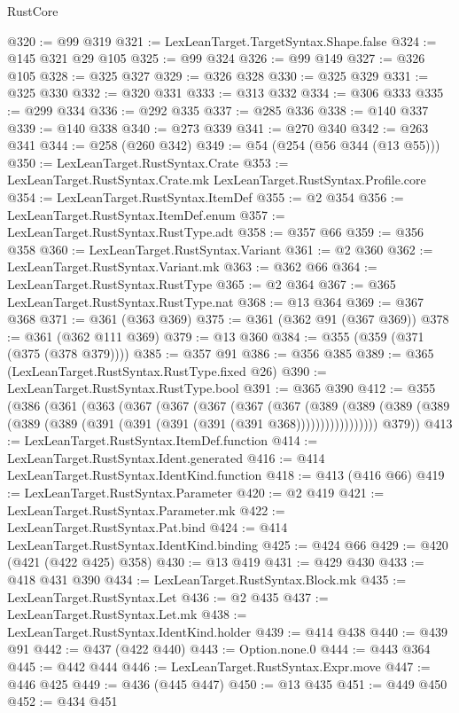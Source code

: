 \begin{lexlean}{RustCore}
\begin{coremodule}
@320 := @99 @319
@321 := LexLeanTarget.TargetSyntax.Shape.false
@324 := @145 @321 @29 @105
@325 := @99 @324
@326 := @99 @149
@327 := @326 @105
@328 := @325 @327
@329 := @326 @328
@330 := @325 @329
@331 := @325 @330
@332 := @320 @331
@333 := @313 @332
@334 := @306 @333
@335 := @299 @334
@336 := @292 @335
@337 := @285 @336
@338 := @140 @337
@339 := @140 @338
@340 := @273 @339
@341 := @270 @340
@342 := @263 @341
@344 := @258 (@260 @342)
@349 := @54 (@254 (@56 @344 (@13 @55)))
@350 := LexLeanTarget.RustSyntax.Crate
@353 := LexLeanTarget.RustSyntax.Crate.mk LexLeanTarget.RustSyntax.Profile.core
@354 := LexLeanTarget.RustSyntax.ItemDef
@355 := @2 @354
@356 := LexLeanTarget.RustSyntax.ItemDef.enum
@357 := LexLeanTarget.RustSyntax.RustType.adt
@358 := @357 @66
@359 := @356 @358
@360 := LexLeanTarget.RustSyntax.Variant
@361 := @2 @360
@362 := LexLeanTarget.RustSyntax.Variant.mk
@363 := @362 @66
@364 := LexLeanTarget.RustSyntax.RustType
@365 := @2 @364
@367 := @365 LexLeanTarget.RustSyntax.RustType.nat
@368 := @13 @364
@369 := @367 @368
@371 := @361 (@363 @369)
@375 := @361 (@362 @91 (@367 @369))
@378 := @361 (@362 @111 @369)
@379 := @13 @360
@384 := @355 (@359 (@371 (@375 (@378 @379))))
@385 := @357 @91
@386 := @356 @385
@389 := @365 (LexLeanTarget.RustSyntax.RustType.fixed @26)
@390 := LexLeanTarget.RustSyntax.RustType.bool
@391 := @365 @390
@412 := @355
    (@386
      (@361
        (@363
          (@367
            (@367
              (@367
                (@367
                  (@367
                    (@389
                      (@389
                        (@389 (@389 (@389 (@389 (@391 (@391 (@391 (@391 (@391 @368)))))))))))))))))
        @379))
@413 := LexLeanTarget.RustSyntax.ItemDef.function
@414 := LexLeanTarget.RustSyntax.Ident.generated
@416 := @414 LexLeanTarget.RustSyntax.IdentKind.function
@418 := @413 (@416 @66)
@419 := LexLeanTarget.RustSyntax.Parameter
@420 := @2 @419
@421 := LexLeanTarget.RustSyntax.Parameter.mk
@422 := LexLeanTarget.RustSyntax.Pat.bind
@424 := @414 LexLeanTarget.RustSyntax.IdentKind.binding
@425 := @424 @66
@429 := @420 (@421 (@422 @425) @358)
@430 := @13 @419
@431 := @429 @430
@433 := @418 @431 @390
@434 := LexLeanTarget.RustSyntax.Block.mk
@435 := LexLeanTarget.RustSyntax.Let
@436 := @2 @435
@437 := LexLeanTarget.RustSyntax.Let.mk
@438 := LexLeanTarget.RustSyntax.IdentKind.holder
@439 := @414 @438
@440 := @439 @91
@442 := @437 (@422 @440)
@443 := Option.none.{0}
@444 := @443 @364
@445 := @442 @444
@446 := LexLeanTarget.RustSyntax.Expr.move
@447 := @446 @425
@449 := @436 (@445 @447)
@450 := @13 @435
@451 := @449 @450
@452 := @434 @451

\end{coremodule}
\end{lexlean}

